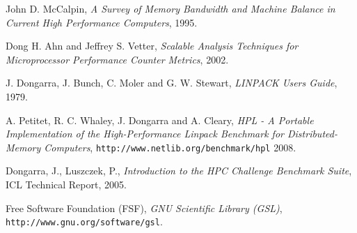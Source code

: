 \documentclass[a4paper]{report}
\begin{document}
\begin{thebibliography}{9}
  John D. McCalpin,
  \emph{A Survey of Memory Bandwidth and Machine Balance in Current High
    Performance Computers},
  1995.
  
  Dong H. Ahn and Jeffrey S. Vetter,
  \emph{Scalable Analysis Techniques for Microprocessor Performance Counter
    Metrics},
  2002.
  
  J. Dongarra, J. Bunch, C. Moler and G. W. Stewart, 
  \emph{LINPACK Users Guide},
  1979.
  
  A. Petitet, R. C. Whaley, J. Dongarra and A. Cleary, 
  \emph{HPL - A Portable Implementation of the High-Performance Linpack
    Benchmark for Distributed-Memory Computers}, {\tt http://www.netlib.org/benchmark/hpl}
  2008.

  Dongarra, J., Luszczek, P.,
  \emph{Introduction to the HPC Challenge Benchmark Suite}, ICL Technical Report,
  2005.  
  
  Free Software Foundation (FSF), \emph{GNU Scientific Library (GSL)},
  {\tt http://www.gnu.org/software/gsl}.

\end{thebibliography}
\end{document}
